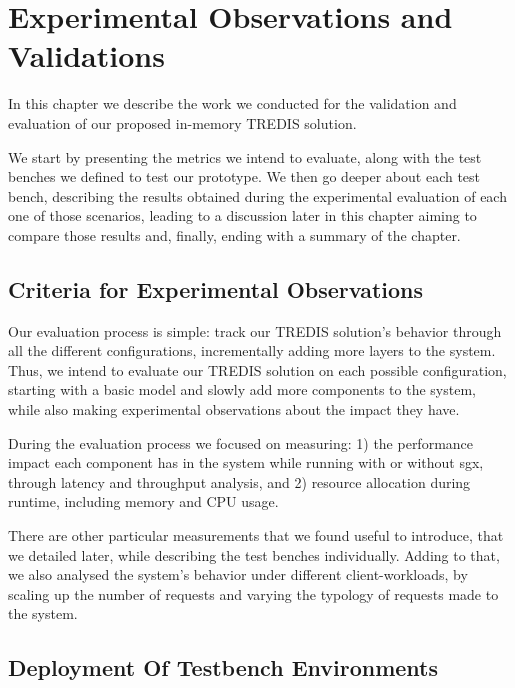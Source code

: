 \chapter{Experimental Observations and Validations}
\label{cha:experimentalEvaluation}

In this chapter we describe the work we conducted for the validation and evaluation of our proposed in-memory TREDIS solution. 

We start by presenting the metrics we intend to evaluate, along with the test benches we defined to test our prototype.
We then go deeper about each test bench, describing the results obtained during the experimental evaluation of each one of those scenarios, leading to a discussion later in this chapter aiming to compare those results and, finally, ending with a summary of the chapter.


\section{Criteria for Experimental Observations}
\label{sec:criteriaForExperimentalObservations}

Our evaluation process is simple: track our TREDIS solution's behavior through all the different configurations, incrementally adding more layers to the system. Thus, we intend to evaluate our TREDIS solution on each possible configuration, starting with a basic model and slowly add more components to the system, while also making experimental observations about the impact they have. 

During the evaluation process we focused on measuring: 1) the performance impact each component has in the system while running with or without \gls{sgx}, through latency and throughput analysis, and 2) resource allocation during runtime, including memory and CPU usage. 

There are other particular measurements that we found useful to introduce, that we detailed later, while describing the test benches individually.
Adding to that, we also analysed the system's behavior under different client-workloads, by scaling up the number of requests and varying the typology of requests made to the system.


\section{Deployment Of Testbench Environments}
\label{sec:testBenchEnvironments}


